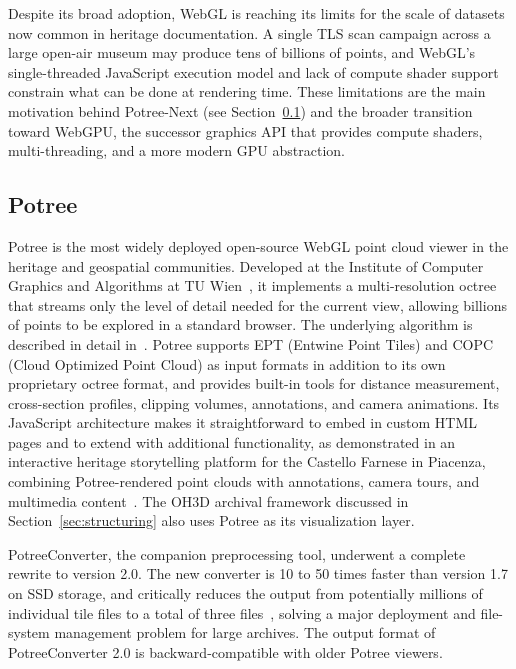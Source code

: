 \documentclass[]{report}
\begin{document}
Despite its broad adoption, WebGL is reaching its limits for the scale of datasets now common in
heritage documentation. A single TLS scan campaign across a large open-air museum may produce
tens of billions of points, and WebGL's single-threaded JavaScript execution model and lack of
compute shader support constrain what can be done at rendering time. These limitations are the
main motivation behind Potree-Next (see Section~\ref{subsec:potree}) and the broader transition
toward WebGPU, the successor graphics API that provides compute shaders, multi-threading, and
a more modern GPU abstraction.

\subsection{Potree}
\label{subsec:potree}

Potree is the most widely deployed open-source WebGL point cloud viewer in the heritage and
geospatial communities. Developed at the Institute of Computer Graphics and Algorithms at TU
Wien~\cite{schuetz2016potree}, it implements a multi-resolution octree that
streams only the level of detail needed for the current view, allowing billions of points to be
explored in a standard browser. The underlying algorithm is described in detail in~\cite{schuetz2020octree}. Potree supports EPT (Entwine Point Tiles) and COPC (Cloud
Optimized Point Cloud) as input formats in addition to its own proprietary octree format, and
provides built-in tools for distance measurement, cross-section profiles, clipping volumes,
annotations, and camera animations. Its JavaScript architecture makes it straightforward to
embed in custom HTML pages and to extend with additional functionality, as demonstrated in an interactive heritage storytelling
platform for the Castello Farnese in Piacenza, combining Potree-rendered point clouds with
annotations, camera tours, and multimedia content~\cite{gaspari2023webgl}. The OH3D archival framework discussed in
Section~\ref{sec:structuring} also uses Potree as its visualization layer.

PotreeConverter, the companion preprocessing tool, underwent a complete rewrite to version 2.0.
The new converter is 10 to 50 times faster than version 1.7 on SSD storage, and critically
reduces the output from potentially millions of individual tile files to a total of three
files~\cite{potreeconverter_github}, solving a major deployment and file-system management
problem for large archives. The output format of PotreeConverter 2.0 is backward-compatible
with older Potree viewers.
\end{document}
